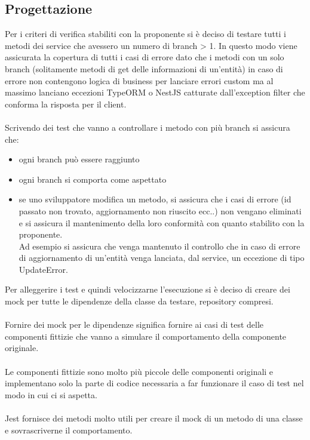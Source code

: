 \subsection{Progettazione}
Per i criteri di verifica stabiliti con la proponente si è deciso di testare tutti i metodi dei service che
avessero un numero di branch > 1. In questo modo viene assicurata la copertura di tutti i casi di errore
dato che i metodi con un solo branch (solitamente metodi di get delle informazioni di un'entità) in caso 
di errore non contengono logica di business per lanciare errori custom ma al massimo lanciano eccezioni
TypeORM o NestJS catturate dall'exception filter che conforma la risposta per il client.
\\\\
Scrivendo dei test che vanno a controllare i metodo con più branch si assicura che:
\begin{itemize}
    \item ogni branch può essere raggiunto
    \item ogni branch si comporta come aspettato
    \item se uno sviluppatore modifica un metodo, si assicura che i casi di errore (id passato non trovato, 
    aggiornamento non riuscito ecc..) non vengano eliminati e si assicura il mantenimento della loro
    conformità con quanto stabilito con la proponente. 
    \\
    Ad esempio si assicura che venga mantenuto il controllo che in caso di errore di aggiornamento di un'entità
    venga lanciata, dal service, un eccezione di tipo UpdateError.
\end{itemize}
\leavevmode\newline
Per alleggerire i test e quindi velocizzarne l'esecuzione si è deciso di creare dei mock per tutte le dipendenze
della classe da testare, repository compresi.
\\\\
Fornire dei mock per le dipendenze significa fornire ai casi di test delle componenti fittizie che vanno a simulare
il comportamento della componente originale. 
\\\\
Le componenti fittizie sono molto più piccole delle componenti originali e implementano solo la parte di codice 
necessaria a far funzionare il caso di test nel modo in cui ci si aspetta.
\\\\
Jest fornisce dei metodi molto utili per creare il mock di un metodo di una classe e sovrascriverne il comportamento.
